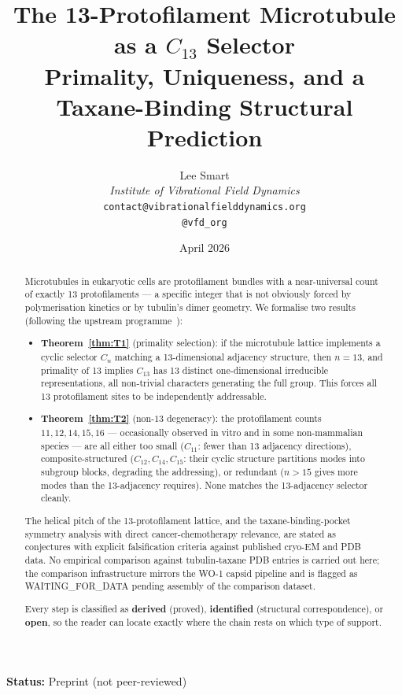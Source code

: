 \documentclass[12pt]{article}
\title{The 13-Protofilament Microtubule as a $C_{13}$ Selector\\[6pt]
\large Primality, Uniqueness, and a Taxane-Binding Structural Prediction}
\author{%
  Lee Smart\\[4pt]
  \textit{Institute of Vibrational Field Dynamics}\\[2pt]
  \texttt{contact@vibrationalfielddynamics.org}\\[2pt]
  \texttt{@vfd\_org}%
}
\date{April 2026}
\begin{document}
\maketitle

\noindent\textbf{Status:} Preprint (not peer-reviewed)

\begin{abstract}
Microtubules in eukaryotic cells are protofilament bundles with a
near-universal count of exactly 13 protofilaments --- a specific
integer that is not obviously forced by polymerisation kinetics or
by tubulin's dimer geometry. We formalise two results (following
the upstream programme~\cite{CascadePhotonMicrotubuleAlpha}):
\begin{itemize}
\item \textbf{Theorem~\ref{thm:T1}} (primality selection): if the
  microtubule lattice implements a cyclic selector $C_n$ matching a
  13-dimensional adjacency structure, then $n = 13$, and
  primality of 13 implies $C_{13}$ has 13 distinct one-dimensional
  irreducible representations, all non-trivial characters generating
  the full group. This forces all 13 protofilament sites to be
  independently addressable.
\item \textbf{Theorem~\ref{thm:T2}} (non-$13$ degeneracy): the
  protofilament counts $11, 12, 14, 15, 16$ --- occasionally observed
  in vitro and in some non-mammalian species --- are all either
  too small ($C_{11}$: fewer than 13 adjacency directions),
  composite-structured ($C_{12}, C_{14}, C_{15}$: their cyclic
  structure partitions modes into subgroup blocks, degrading the
  addressing), or redundant ($n > 15$ gives more modes than the
  13-adjacency requires). None matches the 13-adjacency selector
  cleanly.
\end{itemize}
The helical pitch of the 13-protofilament lattice, and the
taxane-binding-pocket symmetry analysis with direct
cancer-chemotherapy relevance, are stated as conjectures with
explicit falsification criteria against published cryo-EM and PDB
data. No empirical comparison against tubulin-taxane PDB entries
is carried out here; the comparison infrastructure mirrors the
WO-1 capsid pipeline and is flagged as WAITING\_FOR\_DATA pending
assembly of the comparison dataset.

Every step is classified as \textbf{derived} (proved),
\textbf{identified} (structural correspondence), or
\textbf{open}, so the reader can locate exactly where the chain
rests on which type of support.
\end{abstract}
\end{document}
